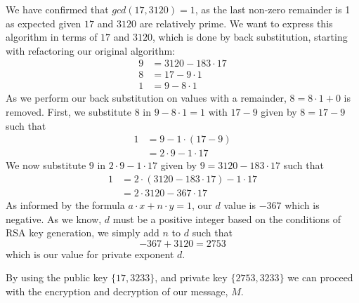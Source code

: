 \documentclass{article}
\begin{document}
We have confirmed that $gcd(17, 3120) = 1$, as the last non-zero remainder is 1 as expected given $17$ and $3120$ are relatively prime. We want to express this algorithm in terms of $17$ and $3120$, which is done by back substitution, starting with refactoring our original algorithm:
\begin{equation}
\begin{aligned}
9 &= 3120 - 183 \cdot 17 \\
8 &= 17 - 9 \cdot  1 \\
1 &= 9 - 8 \cdot 1
\end{aligned}
\end{equation}
As we perform our back substitution on values with a remainder, $8 = 8 \cdot 1 + 0$ is removed. First, we substitute $8$ in $9 - 8 \cdot 1 = 1$ with $17 - 9$ given by $8 = 17 - 9$ such that
\begin{equation}
\begin{aligned}
1 &= 9 - 1\cdot(17 - 9)\\
&= 2 \cdot 9 - 1 \cdot 17
\end{aligned}
\end{equation}
We now substitute $9$ in $2 \cdot 9 - 1 \cdot 17$ given by $9 = 3120 - 183 \cdot 17$ such that
\begin{equation}
\begin{aligned}
1 &= 2 \cdot (3120 - 183 \cdot 17) - 1 \cdot 17 \\
&= 2 \cdot 3120 - 367 \cdot 17
\end{aligned}
\end{equation}
As informed by the formula $a \cdot x + n \cdot y = 1$, our $d$ value is $-367$ which is negative. As we know, $d$ must be a positive integer based on the conditions of RSA key generation, we simply add $n$ to $d$ such that
\begin{equation}
-367 + 3120 = 2753
\end{equation}
which is our value for private exponent $d$.

By using the public key $\{17,3233\}$, and private key $\{2753, 3233\}$ we can proceed with the encryption and decryption of our message, $M$.
\end{document}
